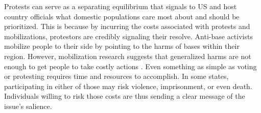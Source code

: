 Protests can serve as a separating equilibrium that signals to US and host country officials what domestic populations care most about and should be prioritized. This is because by incurring the costs associated with protests and mobilizations, protestors are credibly signaling their resolve. Anti-base activists mobilize people to their side by pointing to the harms of bases within their region. However, mobilization research suggests that generalized harms are not enough to get people to take costly actions \cite{Olson1965,lichbach1993}. Even something as simple as voting or protesting requires time and resources to accomplish\cite{downs1957}. In some states, participating in either of those may risk violence, imprisonment, or even death. Individuals willing to risk those costs are thus sending a clear message of the issue's salience. %


